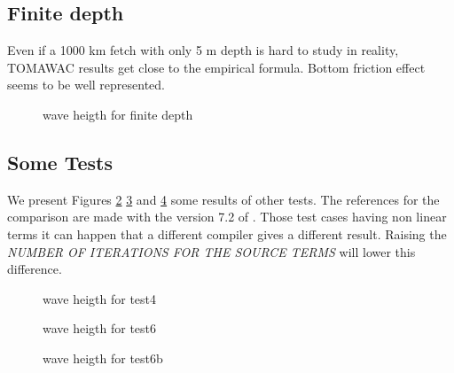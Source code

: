 \subsection{Finite depth}
Even if a 1000 km fetch with only 5 m depth is hard to study in reality, TOMAWAC results get close to the empirical formula. Bottom friction effect seems to be well represented.
\begin{figure}[h!]
  \centering
  \caption{wave heigth for finite depth}
\label{finite}
\end{figure}


\subsection{Some Tests}
We present Figures \ref{test4} \ref{test6} and \ref{test6b} some results of other tests. The references for the comparison are made with the version 7.2 of \tomawac. Those test cases having non linear terms it can happen that a different compiler gives a different result. Raising the {\it NUMBER OF ITERATIONS FOR THE SOURCE TERMS } will lower this difference. 
\begin{figure}[h!]
  \centering
  \caption{wave heigth for test4}
\label{test4}
\end{figure}
\begin{figure}[h!]
  \centering
  \caption{wave heigth for test6}
\label{test6}
\end{figure}
\begin{figure}[h!]
  \centering
  \caption{wave heigth for test6b}
\label{test6b}
\end{figure}
